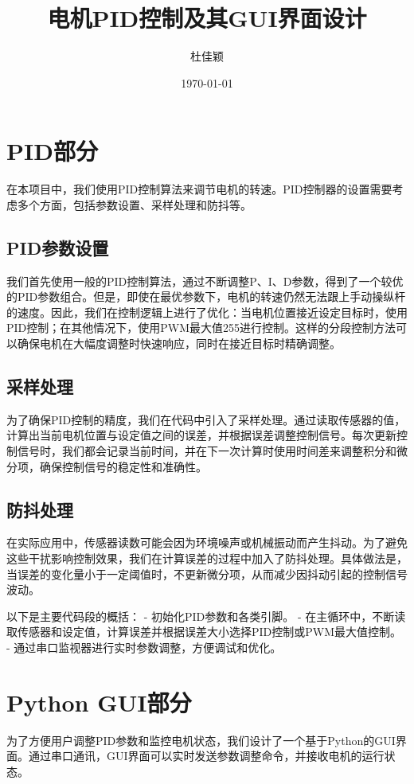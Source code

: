 \documentclass{article}
\title{电机PID控制及其GUI界面设计}
\author{杜佳颖}
\date{\today}
\begin{document}
\maketitle

\section{PID部分}
在本项目中，我们使用PID控制算法来调节电机的转速。PID控制器的设置需要考虑多个方面，包括参数设置、采样处理和防抖等。

\subsection{PID参数设置}
我们首先使用一般的PID控制算法，通过不断调整P、I、D参数，得到了一个较优的PID参数组合。但是，即使在最优参数下，电机的转速仍然无法跟上手动操纵杆的速度。因此，我们在控制逻辑上进行了优化：当电机位置接近设定目标时，使用PID控制；在其他情况下，使用PWM最大值255进行控制。这样的分段控制方法可以确保电机在大幅度调整时快速响应，同时在接近目标时精确调整。

\subsection{采样处理}
为了确保PID控制的精度，我们在代码中引入了采样处理。通过读取传感器的值，计算出当前电机位置与设定值之间的误差，并根据误差调整控制信号。每次更新控制信号时，我们都会记录当前时间，并在下一次计算时使用时间差来调整积分和微分项，确保控制信号的稳定性和准确性。

\subsection{防抖处理}
在实际应用中，传感器读数可能会因为环境噪声或机械振动而产生抖动。为了避免这些干扰影响控制效果，我们在计算误差的过程中加入了防抖处理。具体做法是，当误差的变化量小于一定阈值时，不更新微分项，从而减少因抖动引起的控制信号波动。

以下是主要代码段的概括：
- 初始化PID参数和各类引脚。
- 在主循环中，不断读取传感器和设定值，计算误差并根据误差大小选择PID控制或PWM最大值控制。
- 通过串口监视器进行实时参数调整，方便调试和优化。

\section{Python GUI部分}
为了方便用户调整PID参数和监控电机状态，我们设计了一个基于Python的GUI界面。通过串口通讯，GUI界面可以实时发送参数调整命令，并接收电机的运行状态。
\end{document}
